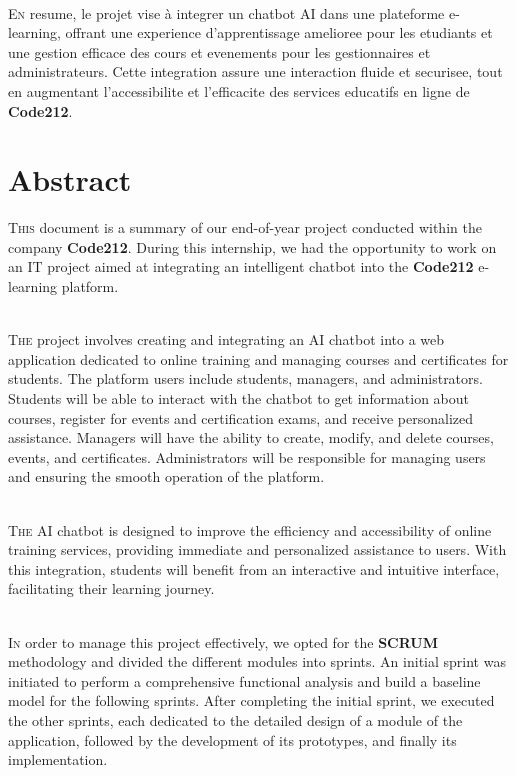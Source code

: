 \documentclass[a4paper, 11pt, openany]{report}
\begin{document}
\ \\

\lettrine[nindent=0em, slope=-.5em]{\color{Eblue}E}{n} resume, le projet vise à integrer un chatbot AI dans une plateforme e-learning, offrant une experience d'apprentissage amelioree pour les etudiants et une gestion efficace des cours et evenements pour les gestionnaires et administrateurs. Cette integration assure une interaction fluide et securisee, tout en augmentant l'accessibilite et l'efficacite des services educatifs en ligne de \textbf{Code212}.

\newpage
\chapter*{Abstract}

\lettrine[nindent=0em, slope=-.5em]{\color{Eblue}T}{his} document is a summary of our end-of-year project conducted within the company \textbf{Code212}. During this internship, we had the opportunity to work on an IT project aimed at integrating an intelligent chatbot into the \textbf{Code212} e-learning platform.

\ \\

\lettrine[nindent=0em, slope=-.5em]{\color{Eblue}T}{he} project involves creating and integrating an AI chatbot into a web application dedicated to online training and managing courses and certificates for students. The platform users include students, managers, and administrators. Students will be able to interact with the chatbot to get information about courses, register for events and certification exams, and receive personalized assistance. Managers will have the ability to create, modify, and delete courses, events, and certificates. Administrators will be responsible for managing users and ensuring the smooth operation of the platform.

\ \\

\lettrine[nindent=0em, slope=-.5em]{\color{Eblue}T}{he} AI chatbot is designed to improve the efficiency and accessibility of online training services, providing immediate and personalized assistance to users. With this integration, students will benefit from an interactive and intuitive interface, facilitating their learning journey.

\ \\

\lettrine[nindent=0em, slope=-.5em]{\color{Eblue}I}{n} order to manage this project effectively, we opted for the \textbf{SCRUM} methodology and divided the different modules into sprints. An initial sprint was initiated to perform a comprehensive functional analysis and build a baseline model for the following sprints. After completing the initial sprint, we executed the other sprints, each dedicated to the detailed design of a module of the application, followed by the development of its prototypes, and finally its implementation.
\end{document}
